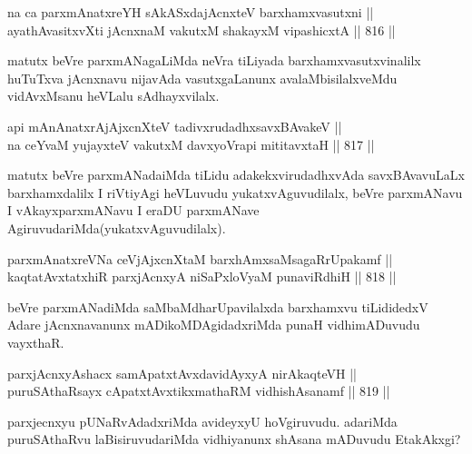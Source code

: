 \begin{shl}
na ca parxmAnatxreYH sAkASxdajAcnxteV barxhamxvasutxni || \\
ayathAvasitxvXti jAcnxnaM vakutxM shakayxM vipashicxtA \hfill || 816 ||  
\end{shl}

\begin{artha}
matutx beVre parxmANagaLiMda neVra tiLiyada barxhamxvasutxvinalilx huTuTxva jAcnxnavu nijavAda vasutxgaLanunx avalaMbisilalxveMdu vidAvxMsanu heVLalu sAdhayxvilalx.
\end{artha}


\begin{shl}
api mAnAnatxrAjAjxcnXteV tadivxrudadhxsavxBAvakeV || \\
na ceYvaM yujayxteV vakutxM davxyoVrapi mititavxtaH \hfill || 817 ||  
\end{shl}

\begin{artha}
matutx beVre parxmANadaiMda tiLidu adakekxvirudadhxvAda savxBAvavuLaLx barxhamxdalilx I riVtiyAgi heVLuvudu yukatxvAguvudilalx, beVre parxmANavu I vAkayxparxmANavu I eraDU parxmANave AgiruvudariMda(yukatxvAguvudilalx).
\end{artha}

\begin{shl}
parxmAnatxreVNa ceVjAjxcnXtaM barxhAmxsaMsagaRrUpakamf || \\
kaqtatAvxtatxhiR parxjAcnxyA niSaPxloV\s yaM punaviRdhiH \hfill || 818 ||  
\end{shl}

\begin{artha}
beVre parxmANadiMda saMbaMdharUpavilalxda barxhamxvu tiLididedxV Adare jAcnxnavanunx mADikoMDAgidadxriMda punaH vidhimADuvudu vayxthaR.
\end{artha}


\begin{shl}
parxjAcnxyAshacx samApatxtAvxdavidAyxyA nirAkaqteVH || \\
puruSAthaRsayx cA\s \s patxtAvxtikxmathaRM vidhishAsanamf \hfill || 819 ||  
\end{shl}

\begin{artha}
parxjecnxyu pUNaRvAdadxriMda avideyxyU hoVgiruvudu. adariMda puruSAthaRvu laBisiruvudariMda vidhiyanunx shAsana mADuvudu EtakAkxgi?
\end{artha}

